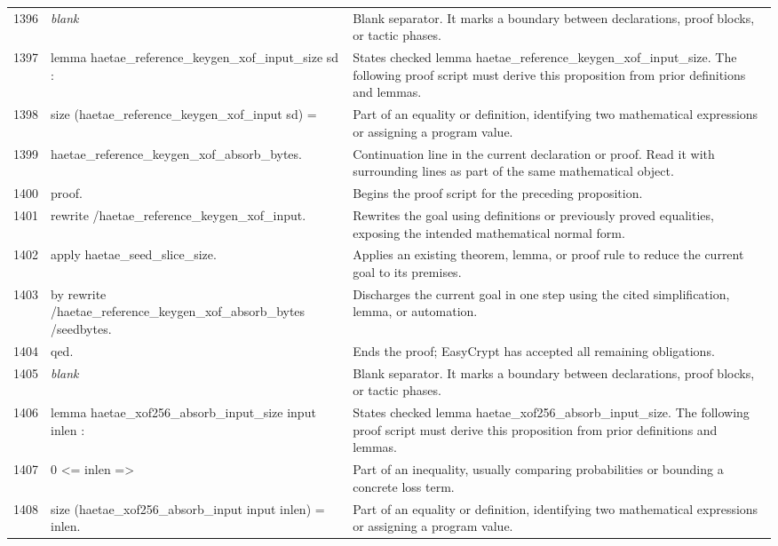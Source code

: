 \documentclass[10pt]{article}
\begin{document}
\begin{longtable}{r L{0.53\textwidth} L{0.37\textwidth}}
1396 & {\ttfamily\scriptsize \emph{blank}} & Blank separator.  It marks a boundary between declarations, proof blocks, or tactic phases. \\
1397 & {\ttfamily\scriptsize lemma haetae\_reference\_keygen\_xof\_input\_size sd :} & States checked lemma haetae\_reference\_keygen\_xof\_input\_size.  The following proof script must derive this proposition from prior definitions and lemmas. \\
1398 & {\ttfamily\scriptsize   size (haetae\_reference\_keygen\_xof\_input sd) =} & Part of an equality or definition, identifying two mathematical expressions or assigning a program value. \\
1399 & {\ttfamily\scriptsize   haetae\_reference\_keygen\_xof\_absorb\_bytes.} & Continuation line in the current declaration or proof.  Read it with surrounding lines as part of the same mathematical object. \\
1400 & {\ttfamily\scriptsize proof.} & Begins the proof script for the preceding proposition. \\
1401 & {\ttfamily\scriptsize rewrite /haetae\_reference\_keygen\_xof\_input.} & Rewrites the goal using definitions or previously proved equalities, exposing the intended mathematical normal form. \\
1402 & {\ttfamily\scriptsize apply haetae\_seed\_slice\_size.} & Applies an existing theorem, lemma, or proof rule to reduce the current goal to its premises. \\
1403 & {\ttfamily\scriptsize by rewrite /haetae\_reference\_keygen\_xof\_absorb\_bytes /seedbytes.} & Discharges the current goal in one step using the cited simplification, lemma, or automation. \\
1404 & {\ttfamily\scriptsize qed.} & Ends the proof; EasyCrypt has accepted all remaining obligations. \\
1405 & {\ttfamily\scriptsize \emph{blank}} & Blank separator.  It marks a boundary between declarations, proof blocks, or tactic phases. \\
1406 & {\ttfamily\scriptsize lemma haetae\_xof256\_absorb\_input\_size input inlen :} & States checked lemma haetae\_xof256\_absorb\_input\_size.  The following proof script must derive this proposition from prior definitions and lemmas. \\
1407 & {\ttfamily\scriptsize   0 <= inlen =>} & Part of an inequality, usually comparing probabilities or bounding a concrete loss term. \\
1408 & {\ttfamily\scriptsize   size (haetae\_xof256\_absorb\_input input inlen) = inlen.} & Part of an equality or definition, identifying two mathematical expressions or assigning a program value. \\

\end{longtable}
\end{document}
